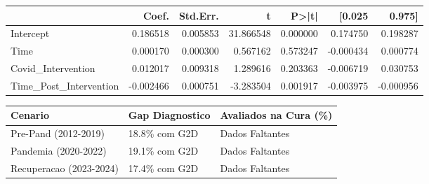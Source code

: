 
\begin{tabular}{lrrrrrr}
\toprule
 & Coef. & Std.Err. & t & P>|t| & [0.025 & 0.975] \\
\midrule
Intercept & 0.186518 & 0.005853 & 31.866548 & 0.000000 & 0.174750 & 0.198287 \\
Time & 0.000170 & 0.000300 & 0.567162 & 0.573247 & -0.000434 & 0.000774 \\
Covid\_Intervention & 0.012017 & 0.009318 & 1.289616 & 0.203363 & -0.006719 & 0.030753 \\
Time\_Post\_Intervention & -0.002466 & 0.000751 & -3.283504 & 0.001917 & -0.003975 & -0.000956 \\
\bottomrule
\end{tabular}


\begin{tabular}{lll}
\toprule
Cenario & Gap Diagnostico & Avaliados na Cura (\%) \\
\midrule
Pre-Pand (2012-2019) & 18.8\% com G2D & Dados Faltantes \\
Pandemia (2020-2022) & 19.1\% com G2D & Dados Faltantes \\
Recuperacao (2023-2024) & 17.4\% com G2D & Dados Faltantes \\
\bottomrule
\end{tabular}
